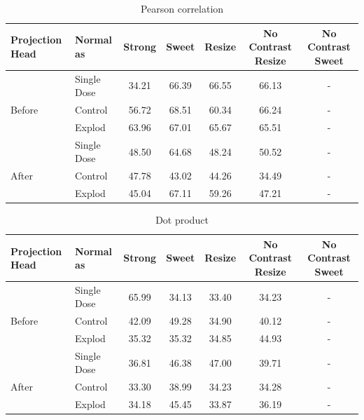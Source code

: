 \begin{table}[H]
  \centering
  \begin{tabular}{@{}llccccc@{}}
  \toprule
  Projection Head & Normal as       & Strong & Sweet & Resize & No Contrast Resize & No Contrast Sweet \\ \midrule
                  & Single Dose    & 34.21      & 66.39     & 66.55      & 66.13                  & -                 \\
  Before          & Control        & 56.72      & 68.51     & 60.34      & 66.24                  & -                 \\
                  & Explod         & 63.96      & 67.01     & 65.67      & 65.51                  & -                 \\ \midrule
                  & Single Dose    & 48.50      & 64.68     & 48.24      & 50.52                  & -                 \\
  After           & Control        & 47.78      & 43.02     & 44.26      & 34.49                  & -                 \\
                  & Explod         & 45.04      & 67.11     & 59.26      & 47.21                  & -                 \\ \bottomrule
  \end{tabular}
  \caption{Pearson correlation}
  \label{tab:table_label}
\end{table}


\begin{table}[H]
  \centering
  \begin{tabular}{@{}llccccc@{}}
  \toprule
  Projection Head & Normal as       & Strong & Sweet & Resize & No Contrast Resize & No Contrast Sweet \\ \midrule
                  & Single Dose    & 65.99      & 34.13     & 33.40      & 34.23                  & -                 \\
  Before          & Control        & 42.09      & 49.28     & 34.90      & 40.12                  & -                 \\
                  & Explod         & 35.32      & 35.32     & 34.85      & 44.93                  & -                 \\ \midrule
                  & Single Dose    & 36.81      & 46.38     & 47.00      & 39.71                  & -                 \\
  After           & Control        & 33.30      & 38.99     & 34.23      & 34.28                  & -                 \\
                  & Explod         & 34.18      & 45.45     & 33.87      & 36.19                  & -                 \\ \bottomrule
  \end{tabular}
  \caption{Dot product}
  \label{tab:table_label}
\end{table}

